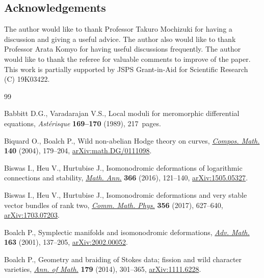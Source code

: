 \documentclass[pdftex]{sigma}
\numberwithin{equation}{section}
\begin{document}
\subsection*{Acknowledgements}

The author would like to thank Professor Takuro Mochizuki for
having a discussion and giving a useful advice.
The author also would like to thank Professor Arata Komyo for
having useful discussions frequently.
The author would like to thank the referee for valuable comments to
improve of the paper.
This work is partially supported by
JSPS Grant-in-Aid for Scientific Research (C) 19K03422.

\begin{thebibliography}{99}
\footnotesize\itemsep=0pt

Babbitt D.G., Varadarajan V.S., Local moduli for meromorphic differential
 equations, \textit{Ast\'erisque} \textbf{169--170} (1989), 217~pages.

Biquard O., Boalch P., Wild non-abelian {H}odge theory on curves,
 \href{https://doi.org/10.1112/S0010437X03000010}{\textit{Compos. Math.}} \textbf{140} (2004), 179--204,
 \href{https://arxiv.org/abs/math.DG/0111098}{arXiv:math.DG/0111098}.

Biswas I., Heu V., Hurtubise J., Isomonodromic deformations of logarithmic
 connections and stability, \href{https://doi.org/10.1007/s00208-015-1318-5}{\textit{Math. Ann.}} \textbf{366} (2016), 121--140,
 \href{https://arxiv.org/abs/1505.05327}{arXiv:1505.05327}.

Biswas I., Heu V., Hurtubise J., Isomonodromic deformations and very stable
 vector bundles of rank two, \href{https://doi.org/10.1007/s00220-017-2987-6}{\textit{Comm. Math. Phys.}} \textbf{356} (2017),
 627--640, \href{https://arxiv.org/abs/1703.07203}{arXiv:1703.07203}.

Boalch P., Symplectic manifolds and isomonodromic deformations, \href{https://doi.org/10.1006/aima.2001.1998}{\textit{Adv.
 Math.}} \textbf{163} (2001), 137--205, \href{https://arxiv.org/abs/2002.00052}{arXiv:2002.00052}.

Boalch P., Geometry and braiding of {S}tokes data; fission and wild character
 varieties, \href{https://doi.org/10.4007/annals.2014.179.1.5}{\textit{Ann. of Math.}} \textbf{179} (2014), 301--365,
 \href{https://arxiv.org/abs/1111.6228}{arXiv:1111.6228}.


\end{thebibliography}
\end{document}

